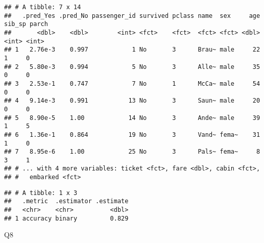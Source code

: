\documentclass[]{article}
\newenvironment{Shaded}{\begin{snugshade}}{\end{snugshade}}
\newcommand{\DataTypeTok}[1]{\textcolor[rgb]{0.13,0.29,0.53}{#1}}
\newcommand{\KeywordTok}[1]{\textcolor[rgb]{0.13,0.29,0.53}{\textbf{#1}}}
\newcommand{\NormalTok}[1]{#1}
\newcommand{\OperatorTok}[1]{\textcolor[rgb]{0.81,0.36,0.00}{\textbf{#1}}}
\newcommand{\OtherTok}[1]{\textcolor[rgb]{0.56,0.35,0.01}{#1}}
\newcommand{\StringTok}[1]{\textcolor[rgb]{0.31,0.60,0.02}{#1}}
\begin{document}
\begin{verbatim}
## # A tibble: 7 x 14
##   .pred_Yes .pred_No passenger_id survived pclass name  sex     age sib_sp parch
##       <dbl>    <dbl>        <int> <fct>    <fct>  <fct> <fct> <dbl>  <int> <int>
## 1   2.76e-3    0.997            1 No       3      Brau~ male     22      1     0
## 2   5.80e-3    0.994            5 No       3      Alle~ male     35      0     0
## 3   2.53e-1    0.747            7 No       1      McCa~ male     54      0     0
## 4   9.14e-3    0.991           13 No       3      Saun~ male     20      0     0
## 5   8.90e-5    1.00            14 No       3      Ande~ male     39      1     5
## 6   1.36e-1    0.864           19 No       3      Vand~ fema~    31      1     0
## 7   8.95e-6    1.00            25 No       3      Pals~ fema~     8      3     1
## # ... with 4 more variables: ticket <fct>, fare <dbl>, cabin <fct>,
## #   embarked <fct>
\end{verbatim}

\begin{Shaded}
\end{Shaded}

\begin{verbatim}
## # A tibble: 1 x 3
##   .metric  .estimator .estimate
##   <chr>    <chr>          <dbl>
## 1 accuracy binary         0.829
\end{verbatim}

Q8

\begin{Shaded}
\end{Shaded}
\end{document}
